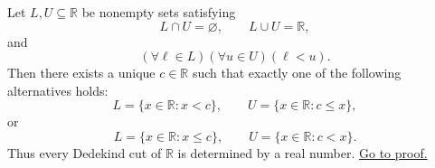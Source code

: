 \begin{corollary}
\label{cor:no-gaps-in-r}
Let $L,U\subseteq\mathbb{R}$ be nonempty sets satisfying
\[
  L\cap U=\varnothing,
  \qquad
  L\cup U=\mathbb{R},
\]
and
\[
  (\forall \ell\in L)(\forall u\in U)(\ell<u).
\]
Then there exists a unique $c\in\mathbb{R}$ such that exactly one of the
following alternatives holds:
\[
  L=\{x\in\mathbb{R}:x<c\},
  \qquad
  U=\{x\in\mathbb{R}:c\leq x\},
\]
or
\[
  L=\{x\in\mathbb{R}:x\leq c\},
  \qquad
  U=\{x\in\mathbb{R}:c<x\}.
\]
Thus every Dedekind cut of $\mathbb{R}$ is determined by a real number.
\hyperref[prf:no-gaps-in-r]{Go to proof.}
\end{corollary}